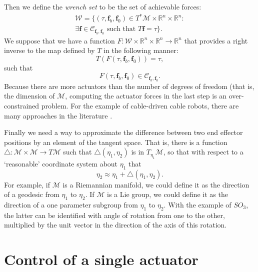 \documentclass[reqno,twocolumn]{amsart}
\newcommand{\liediff}{\mathbin{\triangle}}
\renewcommand{\mathsf}{}
\begin{document}
Then we define the \emph{wrench set} to be the set of achievable forces:
\begin{multline}
\mathcal W = \{ (\tau, \bm f_b, \bm f_0) \in T^*\mathcal M \times \mathbb R^n \times \mathbb R^n: \\ \exists \bm f \in \mathcal C_{\bm f_b, \bm f_0} \text{ such that } \mathsf T \bm f = \tau\} .
\end{multline}
We suppose that we have a function $\mathsf F: \mathcal W \times \mathbb R^n \times \mathbb R^n \to \mathbb R^n$ that provides a right inverse to the map defined by $\mathsf T$ in the following manner:
\begin{equation}
\mathsf T(\mathsf F(\tau, \bm f_b, \bm f_0)) = \tau,
\end{equation}
such that
\begin{equation}
\mathsf F(\tau, \bm f_b, \bm f_0) \in \mathcal C_{\bm f_b, \bm f_0}.
\end{equation}
Because there are more actuators than the number of degrees of freedom (that is, the dimension of $\mathcal M$, computing the actuator forces in the last step is an over-constrained problem.  For the example of cable-driven cable robots, there are many approaches in the literature \cite{gould-toint,gouttefarde-et-al,pott}.

Finally we need a way to approximate the difference between two end effector positions by an element of the tangent space.  That is, there is a function $\liediff: \mathcal M \times \mathcal M \to T \mathcal M$ such that $\liediff(\eta_1,\eta_2)$ is in $T_{\eta_1}\mathcal M$, so that with respect to a `reasonable' coordinate system about $\eta_1$ that
\begin{equation}
\label{lie diff approximation}
\eta_2 \approx \eta_1 + \liediff(\eta_1,\eta_2) .
\end{equation}
For example, if $\mathcal M$ is a Riemannian manifold, we could define it as the direction of a geodesic from $\eta_1$ to $\eta_2$.  If $\mathcal M$ is a Lie group, we could define it as the direction of a one parameter subgroup from $\eta_1$ to $\eta_2$.  With the example of $SO_3$, the latter can be identified with angle of rotation from one to the other, multiplied by the unit vector in the direction of the axis of this rotation.

\section{Control of a single actuator}
\label{control actuator}
\end{document}
